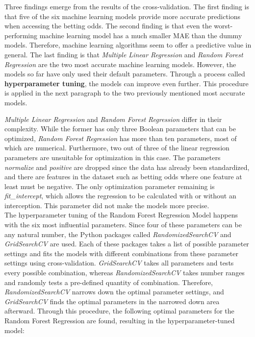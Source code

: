 Three findings emerge from the results of the cross-validation. The first finding is that five of the six machine learning models provide more accurate predictions when accessing the betting odds. The second finding is that even the worst-performing machine learning model has a much smaller MAE than the dummy models. Therefore, machine learning algorithms seem to offer a predictive value in general. The last finding is that \emph{Multiple Linear Regression} and \emph{Random Forest Regression} are the two most accurate machine learning models. However, the models so far have only used their default parameters. Through a process called \textbf{hyperparameter tuning}, the models can improve even further. This procedure is applied in the next paragraph to the two previously mentioned most accurate models.

\emph{Multiple Linear Regression} and \emph{Random Forest Regression} differ in their complexity. While the former has only three Boolean parameters that can be optimized, \emph{Random Forest Regression} has more than ten parameters, most of which are numerical. Furthermore, two out of three of the linear regression parameters are unsuitable for optimization in this case. The parameters \emph{normalize} and \emph{positive} are dropped since the data has already been standardized, and there are features in the dataset such as betting odds where one feature at least must be negative. The only optimization parameter remaining is \emph{fit\_intercept}, which allows the regression to be calculated with or without an interception. This parameter did not make the models more precise. \\
The hyperparameter tuning of the Random Forest Regression Model happens with the six most influential parameters. Since four of these parameters can be any natural number, the Python packages called \emph{RandomizedSearchCV} and \emph{GridSearchCV} are used. Each of these packages takes a list of possible parameter settings and fits the models with different combinations from these parameter settings using cross-validation. \emph{GridSearchCV} takes all parameters and tests every possible combination, whereas \emph{RandomizedSearchCV} takes number ranges and randomly tests a pre-defined quantity of combination. Therefore, \emph{RandomizedSearchCV} narrows down the optimal parameter settings, and \emph{GridSearchCV} finds the optimal parameters in the narrowed down area afterward. Through this procedure, the following optimal parameters for the Random Forest Regression are found, resulting in the hyperparameter-tuned model:

